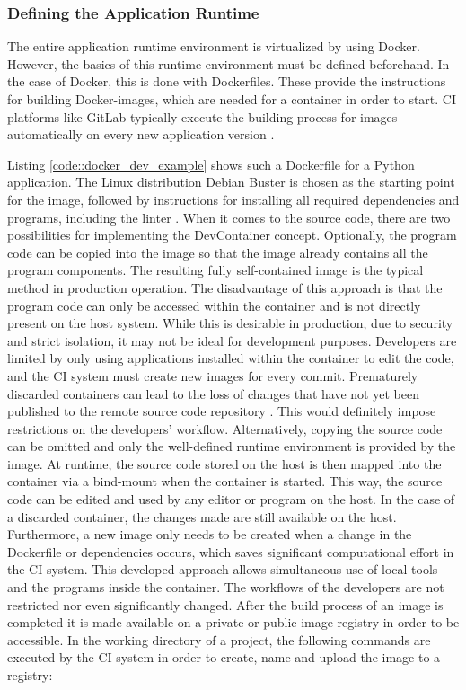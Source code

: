         \subsubsection{Defining the Application Runtime}
        The entire application runtime environment is virtualized by using Docker. However, the basics of this runtime environment must be defined beforehand. In the case of Docker, this is done with Dockerfiles. These provide the instructions for building Docker-images, which are needed for a container in order to start. \ac{CI} platforms like GitLab typically execute the building process for images automatically on every new application version \cite{docker2020}.\newline
        
        Listing \ref{code::docker_dev_example} shows such a Dockerfile for a Python application. The Linux distribution Debian Buster is chosen as the starting point for the image, followed by instructions for installing all required dependencies and programs, including the linter . When it comes to the source code, there are two possibilities for implementing the DevContainer concept. Optionally, the program code can be copied into the image so that the image already contains all the program components. The resulting fully self-contained image is the typical method in production operation. The disadvantage of this approach is that the program code can only be accessed within the container and is not directly present on the host system. While this is desirable in production, due to security and strict isolation, it may not be ideal for development purposes. Developers are limited by only using applications installed within the container to edit the code, and the \ac{CI} system must create new images for every commit. Prematurely discarded containers can lead to the loss of changes that have not yet been published to the remote source code repository \cite{dockerdocs}. This would definitely impose restrictions on the developers' workflow.\newline
        Alternatively, copying the source code can be omitted and only the well-defined runtime environment is provided by the image. At runtime, the source code stored on the host is then mapped into the container via a bind-mount when the container is started. This way, the source code can be edited and used by any editor or program on the host. In the case of a discarded container, the changes made are still available on the host. Furthermore, a new image only needs to be created when a change in the Dockerfile or dependencies occurs, which saves significant computational effort in the \ac{CI} system. This developed approach allows simultaneous use of local tools and the programs inside the container. The workflows of the developers are not restricted nor even significantly changed.\newline
        After the build process of an image is completed it is made available on a private or public image registry in order to be accessible. In the working directory of a project, the following commands are executed by the \ac{CI} system in order to create, name and upload the image to a registry:

